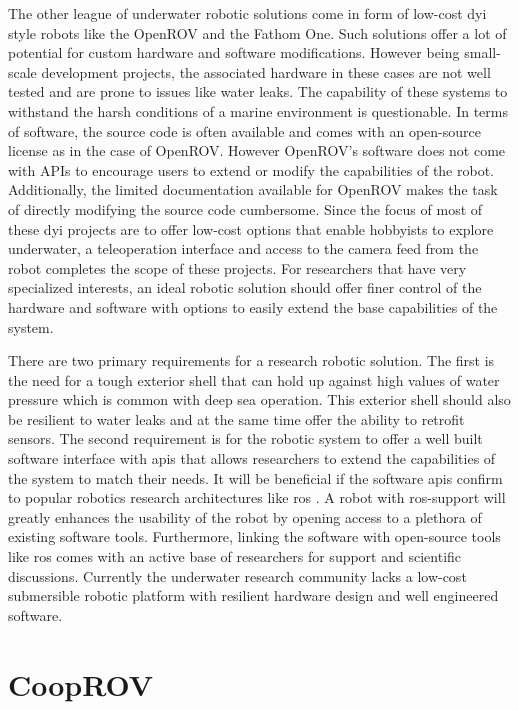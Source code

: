 \documentclass {udthesis}
\begin{document}
The other league of underwater robotic solutions come in form of low-cost \gls{dyi} style robots like the OpenROV \cite{openrov} and the Fathom One\cite{fathomrov}. Such solutions offer a lot of potential for custom hardware and software modifications. However being small-scale development projects, the associated hardware in these cases are not well tested and are prone to issues like water leaks. The capability of these systems to withstand the harsh conditions of a marine environment is questionable. In terms of software, the source code is often available and comes with an open-source license as in the case of OpenROV. However OpenROV's software does not come with APIs to encourage users to extend or modify the capabilities of the robot. Additionally, the limited documentation available for OpenROV makes the task of directly modifying the source code cumbersome. Since the focus of most of these \gls{dyi} projects are to offer low-cost options that enable hobbyists to explore underwater, a teleoperation 
interface and access to the camera feed from the robot completes the scope of these projects. For researchers that have very specialized interests, an ideal robotic solution should offer finer control of the hardware and software with options to easily extend the base capabilities of the system.

There are two primary requirements for a research robotic solution. The first is the need for a tough exterior shell that can hold up against high values of water pressure which is common with deep sea operation. This exterior shell should also be resilient to water leaks and at the same time offer the ability to retrofit sensors. The second requirement is for the robotic system to offer a well built software interface with \gls{api}s that allows researchers to extend the capabilities of the system to match their needs. It will be beneficial if the software \gls{api}s confirm to popular robotics research architectures like \gls{ros} \cite{ros}. A robot with \gls{ros}-support will greatly enhances the usability of the robot by opening access to a plethora of existing software tools. Furthermore, linking the software with open-source tools like \gls{ros} comes with an active base of researchers for support and scientific discussions. Currently the underwater research community lacks a low-cost submersible 
robotic platform with resilient hardware design and well engineered software.

\section{CoopROV}
\end{document}
